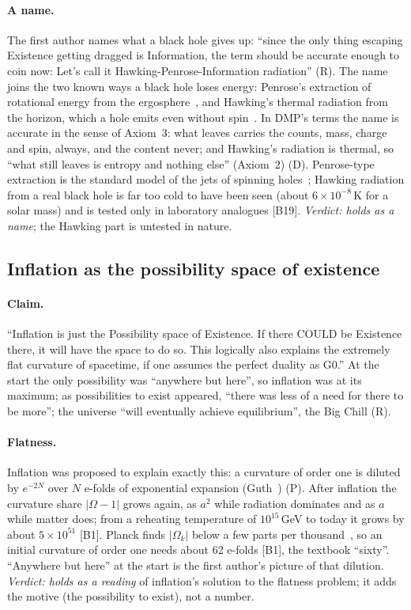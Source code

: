 \documentclass[11pt,a4paper]{article}
\theoremstyle{definition}
\newcommand{\chk}[1]{\textsf{[#1]}}
\newcommand{\tagD}{\textsf{(D)}}
\newcommand{\tagR}{\textsf{(R)}}
\newcommand{\tagP}{\textsf{(P)}}
\begin{document}
\paragraph{A name.} The first author names what a black hole gives up: ``since the only thing escaping Existence getting dragged is
Information, the term should be accurate enough to coin now: Let's call it Hawking-Penrose-Information radiation'' \tagR. The name joins
the two known ways a black hole loses energy: Penrose's extraction of rotational energy from the ergosphere~\cite{penrose69}, and Hawking's
thermal radiation from the horizon, which a hole emits even without spin~\cite{hawking}. In DMP's terms the name is accurate in the sense of
Axiom~3: what leaves carries the counts, mass, charge and spin, always, and the content never; and Hawking's radiation is thermal, so
``what still leaves is entropy and nothing else'' (Axiom~2) \tagD. Penrose-type extraction is the standard model of the jets of spinning
holes~\cite{bz}; Hawking radiation from a real black hole is far too cold to have been seen (about $6\times10^{-8}$\,K for a solar mass)
and is tested only in laboratory analogues \chk{B19}. \emph{Verdict: holds as a name}; the Hawking part is untested in nature.

\subsection{Inflation as the possibility space of existence}\label{sec:inflation}

\paragraph{Claim.} ``Inflation is just the Possibility space of Existence. If there COULD be Existence there, it will have the space to do
so. This logically also explains the extremely flat curvature of spacetime, if one assumes the perfect duality as G0.'' At the start the
only possibility was ``anywhere but here'', so inflation was at its maximum; as possibilities to exist appeared, ``there was less of a need
for there to be more''; the universe ``will eventually achieve equilibrium'', the Big Chill \tagR.

\paragraph{Flatness.} Inflation was proposed to explain exactly this: a curvature of order one is diluted by $e^{-2N}$ over $N$ e-folds of
exponential expansion (Guth~\cite{guth}) \tagP. After inflation the curvature share $|\Omega-1|$ grows again, as $a^2$ while radiation
dominates and as $a$ while matter does; from a reheating temperature of $10^{15}$\,GeV to today it grows by about $5\times10^{51}$
\chk{B1}. Planck finds $|\Omega_k|$ below a few parts per thousand~\cite{planck18}, so an initial curvature of order one needs about 62
e-folds \chk{B1}, the textbook ``sixty''. ``Anywhere but here'' at the start is the first author's picture of that dilution.
\emph{Verdict: holds as a reading} of inflation's solution to the flatness problem; it adds the motive (the possibility to exist), not a
number.
\end{document}
